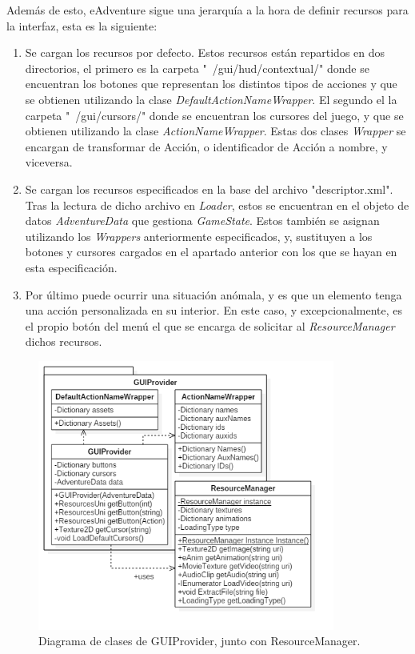Además de esto, eAdventure sigue una jerarquía a la hora de definir recursos para la interfaz, esta es la siguiente:

\begin{enumerate}
	\item Se cargan los recursos por defecto. Estos recursos están repartidos en dos directorios, el primero es la carpeta "~/gui/hud/contextual/" donde se encuentran los botones que representan los distintos tipos de acciones y que se obtienen utilizando la clase \textit{DefaultActionNameWrapper}. El segundo el la carpeta "~/gui/cursors/" donde se encuentran los cursores del juego, y que se obtienen utilizando la clase \textit{ActionNameWrapper}. Estas dos clases \textit{Wrapper} se encargan de transformar de Acción, o identificador de Acción a nombre, y viceversa.
	
	\item Se cargan los recursos especificados en la base del archivo "descriptor.xml". Tras la lectura de dicho archivo en \textit{Loader}, estos se encuentran en el objeto de datos \textit{AdventureData} que gestiona \textit{GameState}. Estos también se asignan utilizando los \textit{Wrappers} anteriormente especificados, y, sustituyen a los botones y cursores cargados en el apartado anterior con los que se hayan en esta especificación.
	
	\item Por último puede ocurrir una situación anómala, y es que un elemento tenga una acción personalizada en su interior. En este caso, y excepcionalmente, es el propio botón del menú el que se encarga de solicitar al \textit{ResourceManager} dichos recursos.
	
\end{enumerate}

\begin{figure}[h!]
	\centerline{\includegraphics[height=3.5in]{figures/it2/GUIProvider.png}}
	\caption[GUIProvider - Versión Final]{Diagrama de clases de GUIProvider, junto con ResourceManager.}
	\label{guiproviderit2}
\end{figure}

